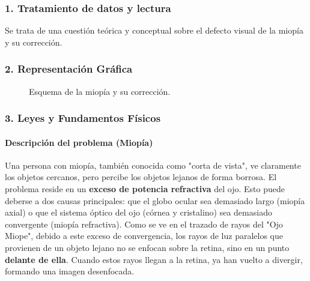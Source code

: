 \subsubsection*{1. Tratamiento de datos y lectura}
Se trata de una cuestión teórica y conceptual sobre el defecto visual de la miopía y su corrección.

\subsubsection*{2. Representación Gráfica}
\begin{figure}[H]
    \centering
    \hfill
    \caption{Esquema de la miopía y su corrección.}
\end{figure}

\subsubsection*{3. Leyes y Fundamentos Físicos}
\paragraph*{Descripción del problema (Miopía)}
Una persona con miopía, también conocida como "corta de vista", ve claramente los objetos cercanos, pero percibe los objetos lejanos de forma borrosa.
El problema reside en un \textbf{exceso de potencia refractiva} del ojo. Esto puede deberse a dos causas principales: que el globo ocular sea demasiado largo (miopía axial) o que el sistema óptico del ojo (córnea y cristalino) sea demasiado convergente (miopía refractiva).
Como se ve en el trazado de rayos del "Ojo Miope", debido a este exceso de convergencia, los rayos de luz paralelos que provienen de un objeto lejano no se enfocan sobre la retina, sino en un punto \textbf{delante de ella}. Cuando estos rayos llegan a la retina, ya han vuelto a divergir, formando una imagen desenfocada.

